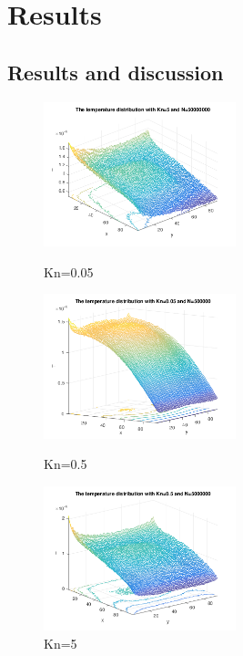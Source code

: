\section{Results}

\subsection{Results and discussion}

\begin{figure}
\begin{minipage}[t]{0.33\linewidth}
\centering
\includegraphics[width=2.2in]{2.png}
\caption{Kn=0.05}
\label{fig:3}
\end{minipage}%
\begin{minipage}[t]{0.33\linewidth}
\centering
\includegraphics[width=2.2in]{3.png}
\caption{Kn=0.5}
\label{fig:4}
\end{minipage}
\begin{minipage}[t]{0.33\linewidth}
\centering
\includegraphics[width=2.2in]{4.png}
\caption{Kn=5}
\label{fig:5}
\end{minipage}%
\end{figure}

